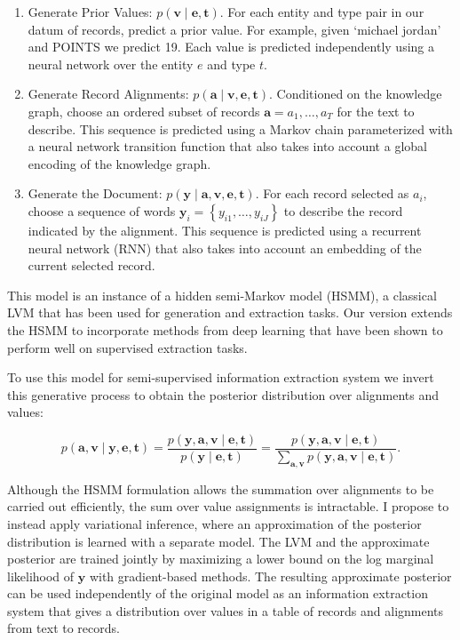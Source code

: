 \documentclass[12pt]{article}
\newcommand\set[1]{\left\{#1\right\}}
\newcommand{\ba}{\mathbf{a}}
\newcommand{\be}{\mathbf{e}}
\newcommand{\bt}{\mathbf{t}}
\newcommand{\bv}{\mathbf{v}}
\newcommand{\by}{\mathbf{y}}
\begin{document}
\begin{enumerate}
\item Generate Prior Values: $p(\bv\mid\be,\bt)$.
For each entity and type pair in our datum of records, predict a prior value.
For example, given `michael jordan' and POINTS we predict 19.
Each value is predicted independently using a neural network over the entity $e$ and type $t$. 
\item Generate Record Alignments: $p(\ba \mid\bv,\be,\bt)$.
Conditioned on the knowledge graph, choose an ordered subset of records $\ba =a_1,\ldots,a_T$ for the text to describe. 
This sequence is predicted using a Markov chain parameterized with a neural network transition function that also takes into account a global encoding of the knowledge graph. 
\item Generate the Document: $p(\by\mid\ba,\bv,\be,\bt)$.
For each record selected as $a_i$, choose a sequence of words $\by_i = \set{y_{i1},\ldots,y_{iJ}}$ to describe the record
indicated by the alignment. This sequence is predicted using 
a recurrent neural network (RNN) that also takes into account 
an embedding of the current selected record. 
\end{enumerate}
This model is an instance of a hidden semi-Markov model (HSMM), a classical LVM that has been used for generation and extraction tasks. Our version extends the HSMM to incorporate methods from deep learning that have been shown to perform well on supervised extraction tasks.

To use this model for semi-supervised information extraction system we invert this generative process
to obtain the posterior distribution over alignments and values:
\begin{linenomath*}
$$
p(\ba,\bv\mid\by,\be,\bt)=\frac{p(\by,\ba,\bv\mid\be,\bt)}{p(\by\mid\be,\bt)}
=\frac{p(\by,\ba,\bv\mid\be,\bt)}{\sum_{\ba,\bv} p(\by,\ba,\bv\mid\be,\bt)}.
$$
\end{linenomath*}
Although the HSMM formulation allows the summation over alignments to be carried out efficiently,
the sum over value assignments is intractable.
I propose to instead apply variational inference,
where an approximation of the posterior distribution
is learned with a separate model.
The LVM and the approximate posterior are trained jointly 
by maximizing a lower bound on the log marginal likelihood of $\by$ with gradient-based methods.
The resulting approximate posterior  can be used independently of the 
original model as an information extraction system that gives a distribution over
values in a table of records and alignments from text to records.
\end{document}
